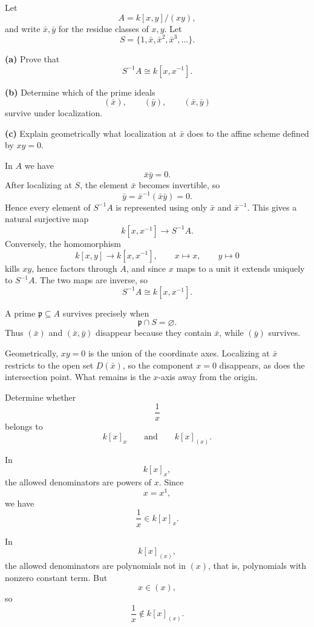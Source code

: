 \begin{problem}[CP-V-0015]
\label{prob:cp-v-0015}
Let
\[
A=k[x,y]/(xy),
\]
and write \(\bar x,\bar y\) for the residue classes of \(x,y\). Let
\[
S=\{1,\bar x,\bar x^2,\bar x^3,\dots\}.
\]

\textbf{(a)} Prove that
\[
S^{-1}A\cong k[x,x^{-1}].
\]

\textbf{(b)} Determine which of the prime ideals
\[
(\bar x),\qquad (\bar y),\qquad (\bar x,\bar y)
\]
survive under localization.

\textbf{(c)} Explain geometrically what localization at \(\bar x\) does to
the affine scheme defined by \(xy=0\).
\end{problem}

\begin{solution}
In \(A\) we have
\[
\bar x\bar y=0.
\]
After localizing at \(S\), the element \(\bar x\) becomes invertible, so
\[
\bar y=\bar x^{-1}(\bar x\bar y)=0.
\]
Hence every element of \(S^{-1}A\) is represented using only \(\bar x\) and
\(\bar x^{-1}\). This gives a natural surjective map
\[
k[x,x^{-1}]\longrightarrow S^{-1}A.
\]
Conversely, the homomorphism
\[
k[x,y]\longrightarrow k[x,x^{-1}],
\qquad
x\mapsto x,\qquad y\mapsto 0
\]
kills \(xy\), hence factors through \(A\), and since \(x\) maps to a unit it
extends uniquely to \(S^{-1}A\). The two maps are inverse, so
\[
S^{-1}A\cong k[x,x^{-1}].
\]

A prime \(\mathfrak p\subseteq A\) survives precisely when
\[
\mathfrak p\cap S=\varnothing.
\]
Thus \((\bar x)\) and \((\bar x,\bar y)\) disappear because they contain
\(\bar x\), while \((\bar y)\) survives.

Geometrically, \(xy=0\) is the union of the coordinate axes. Localizing at
\(\bar x\) restricts to the open set \(D(\bar x)\), so the component
\(x=0\) disappears, as does the intersection point. What remains is the
\(x\)-axis away from the origin.
\end{solution}


\begin{problem}[CP-V-0059]
\label{prob:cp-v-0059}
Determine whether
\[
\frac{1}{x}
\]
belongs to
\[
k[x]_x
\qquad\text{and}\qquad
k[x]_{(x)}.
\]
\end{problem}

\begin{solution}
In
\[
k[x]_x,
\]
the allowed denominators are powers of \(x\). Since
\[
x=x^1,
\]
we have
\[
\frac{1}{x}\in k[x]_x.
\]

In
\[
k[x]_{(x)},
\]
the allowed denominators are polynomials not in \((x)\), that is, polynomials with nonzero constant term. But
\[
x\in (x),
\]
so
\[
\frac{1}{x}\notin k[x]_{(x)}.
\]
\end{solution}


